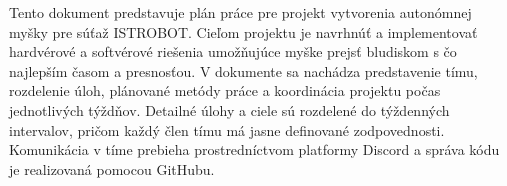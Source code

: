 Tento dokument predstavuje plán práce pre projekt vytvorenia autonómnej myšky pre súťaž ISTROBOT. Cieľom projektu je navrhnúť a implementovať hardvérové a softvérové riešenia umožňujúce myške prejsť bludiskom s čo najlepším časom a presnosťou. V dokumente sa nachádza predstavenie tímu, rozdelenie úloh, plánované metódy práce a koordinácia projektu počas jednotlivých týždňov. Detailné úlohy a ciele sú rozdelené do týždenných intervalov, pričom každý člen tímu má jasne definované zodpovednosti. Komunikácia v tíme prebieha prostredníctvom platformy Discord a správa kódu je realizovaná pomocou GitHubu.

